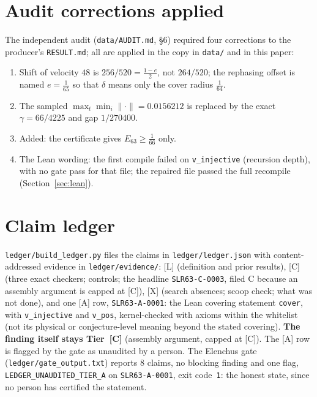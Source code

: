 \documentclass[10pt]{article}
\newcommand{\tier}[1]{\textsf{[#1]}}
\newcommand{\tA}{\tier{A}}
\newcommand{\tL}{\tier{L}}
\newcommand{\tC}{\tier{C}}
\newcommand{\tX}{\tier{X}}
\newcommand{\lean}[1]{\texttt{#1}}
\begin{document}
\section{Audit corrections applied}\label{sec:corr}
The independent audit (\texttt{data/AUDIT.md}, \S6) required four corrections to the producer's \texttt{RESULT.md}; all are applied in the copy in \texttt{data/} and in this paper:
\begin{enumerate}\itemsep=0pt
\item Shift of velocity $48$ is $256/520=\frac{1-e}2$, not $264/520$; the rephasing offset is named $e=\frac1{65}$ so that $\delta$ means only the cover radius $\frac1{64}$.
\item The sampled $\max_t\min_i\|\cdot\|=0.0156212$ is replaced by the exact $\gamma=66/4225$ and gap $1/270400$.
\item Added: the certificate gives $E_{63}\ge\frac1{66}$ only.
\item The Lean wording: the first compile failed on \lean{v\_injective} (recursion depth), with no gate pass for that file; the repaired file passed the full recompile (Section~\ref{sec:lean}).
\end{enumerate}

\section{Claim ledger}\label{sec:ledger}
\texttt{ledger/build\_ledger.py} files the claims in \texttt{ledger/ledger.json} with content-addressed evidence in \texttt{ledger/evidence/}: \tL{} (definition and prior results), \tC{} (three exact checkers; controls; the headline \texttt{SLR63-C-0003}, filed C because an assembly argument is capped at \tC{}), \tX{} (search absences; scoop check; what was not done), and one \tA{} row, \texttt{SLR63-A-0001}: the Lean covering statement \lean{cover}, with \lean{v\_injective} and \lean{v\_pos}, kernel-checked with axioms within the whitelist (not its physical or conjecture-level meaning beyond the stated covering). \textbf{The finding itself stays Tier~\tC{}} (assembly argument, capped at \tC{}). The \tA{} row is flagged by the gate as unaudited by a person. The Elenchus gate (\texttt{ledger/gate\_output.txt}) reports $8$ claims, no blocking finding and one flag, \texttt{LEDGER\_UNAUDITED\_TIER\_A} on \texttt{SLR63-A-0001}, exit code~\texttt{1}: the honest state, since no person has certified the statement.
\end{document}
